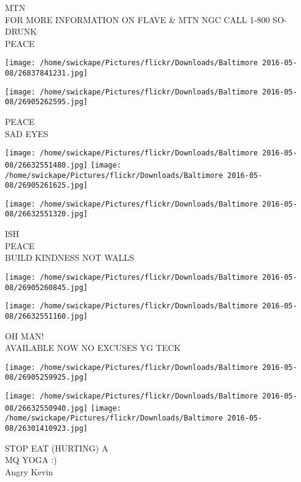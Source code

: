 \documentclass[10pt,letterpaper]{article}
\begin{document}
MTN\\
FOR MORE INFORMATION ON FLAVE \& MTN NGC CALL 1{-}800 SO{-}DRUNK\\
PEACE\\
\pagebreak

\texttt{[image: /home/swickape/Pictures/flickr/Downloads/Baltimore 2016-05-08/26837841231.jpg]}

\vspace{0.25in}
\texttt{[image: /home/swickape/Pictures/flickr/Downloads/Baltimore 2016-05-08/26905262595.jpg]}

PEACE\\
SAD EYES\\
\pagebreak

\texttt{[image: /home/swickape/Pictures/flickr/Downloads/Baltimore 2016-05-08/26632551480.jpg]}
\texttt{[image: /home/swickape/Pictures/flickr/Downloads/Baltimore 2016-05-08/26905261625.jpg]}

\texttt{[image: /home/swickape/Pictures/flickr/Downloads/Baltimore 2016-05-08/26632551320.jpg]}

ISH\\
PEACE\\
BUILD KINDNESS NOT WALLS\\
\pagebreak

\texttt{[image: /home/swickape/Pictures/flickr/Downloads/Baltimore 2016-05-08/26905260845.jpg]}

\vspace{0.25in}
\texttt{[image: /home/swickape/Pictures/flickr/Downloads/Baltimore 2016-05-08/26632551160.jpg]}

OH MAN!\\
AVAILABLE NOW NO EXCUSES YG TECK\\
\pagebreak

\texttt{[image: /home/swickape/Pictures/flickr/Downloads/Baltimore 2016-05-08/26905259925.jpg]}

\vspace{0.25in}
\texttt{[image: /home/swickape/Pictures/flickr/Downloads/Baltimore 2016-05-08/26632550940.jpg]}
\texttt{[image: /home/swickape/Pictures/flickr/Downloads/Baltimore 2016-05-08/26301410923.jpg]}

STOP EAT (HURTING) A\\
MQ YOGA :)\\
Angry Kevin\\
\pagebreak
\end{document}
